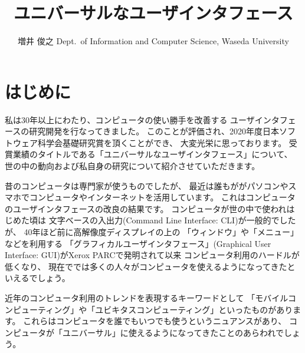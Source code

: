 \documentclass[topics]{compsoft} %
\begin{document}
\title{ユニバーサルなユーザインタフェース}

%
\author{増井 俊之
%
%
%
%
%
{Dept.\ of Information and Computer Science, Waseda University}
%
\shutten
%
%
}

%

\maketitle

\section{はじめに}

私は30年以上にわたり、コンピュータの使い勝手を改善する
ユーザインタフェースの研究開発を行なってきました。
このことが評価され、2020年度日本ソフトウェア科学会基礎研究賞を頂くことができ、
大変光栄に思っております。
受賞業績のタイトルである「ユニバーサルなユーザインタフェース」について、
世の中の動向および私自身の研究について紹介させていただきます。

昔のコンピュータは専門家が使うものでしたが、
最近は誰もががパソコンやスマホでコンピュータやインターネットを活用しています。
これはコンピュータのユーザインタフェースの改良の結果です。
コンピュータが世の中で使われはじめた頃は
文字ベースの入出力(Command Line Interface: CLI)が一般的でしたが、
40年ほど前に高解像度ディスプレイの上の
「ウィンドウ」や「メニュー」などを利用する
「グラフィカルユーザインタフェース」(Graphical User Interface: GUI)がXerox PARCで発明されて以来
コンピュータ利用のハードルが低くなり、
現在ででは多くの人々がコンピュータを使えるようになってきたといえるでしょう。

近年のコンピュータ利用のトレンドを表現するキーワードとして
「モバイルコンピューティング」や「ユビキタスコンピューティング」といったものがあります。
これらはコンピュータを誰でもいつでも使うというニュアンスがあり、
コンピュータが「ユニバーサル」に使えるようになってきたことのあらわれでしょう。
\end{document}
